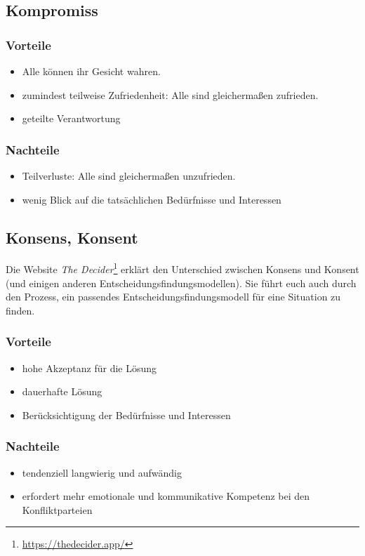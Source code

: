 \subsection{Kompromiss}

\subsubsection{Vorteile}
\begin{itemize}
  \item Alle können ihr Gesicht wahren.
  \item zumindest teilweise Zufriedenheit: Alle sind gleichermaßen zufrieden.
  \item geteilte Verantwortung
\end{itemize}

\subsubsection{Nachteile}
\begin{itemize}
  \item Teilverluste: Alle sind gleichermaßen unzufrieden.
  \item wenig Blick auf die tatsächlichen Bedürfnisse und Interessen
\end{itemize}


\subsection{Konsens, Konsent}

Die Website \emph{The Decider}\footnote{\url{https://thedecider.app/}} erklärt den Unterschied zwischen Konsens und Konsent (und einigen anderen Entscheidungsfindungsmodellen). Sie führt euch auch durch den Prozess, ein passendes Entscheidungsfindungsmodell für eine Situation zu finden.

\subsubsection{Vorteile}
\begin{itemize}
  \item hohe Akzeptanz für die Lösung
  \item dauerhafte Lösung
  \item Berücksichtigung der Bedürfnisse und Interessen
\end{itemize}

\subsubsection{Nachteile}
\begin{itemize}
  \item tendenziell langwierig und aufwändig
  \item erfordert mehr emotionale und kommunikative Kompetenz bei den Konfliktparteien
\end{itemize}
